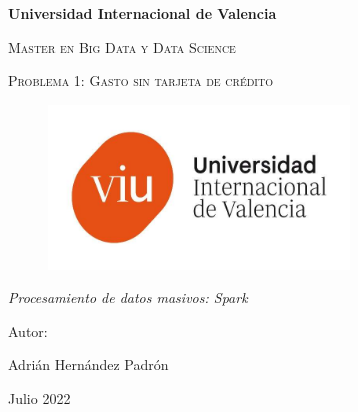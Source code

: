 \documentclass[a4paper]{article}
\begin{document}
\begin{titlepage}
    \centering
    {\bfseries\LARGE Universidad Internacional de Valencia \par}
    \vspace{1cm}
    {\scshape\Large Master en Big Data y Data Science \par}
    \vspace{3cm}
    {\scshape\Huge Problema 1: Gasto sin tarjeta de crédito \par}
    \vspace{1cm}
    \begin{figure}[h]
        \centering
        \includegraphics[width=8cm, keepaspectratio]{Nuevo-Logo-1.jpg}

    \end{figure}
    \vspace{1cm}
    {\itshape\Large Procesamiento de datos masivos: Spark \par}
    \vspace{3cm}
    {\Large Autor: \par}
    {\Large Adrián Hernández Padrón \par}
    {\Large Julio 2022 \par}


\end{titlepage}
\clearpage
\end{document}
